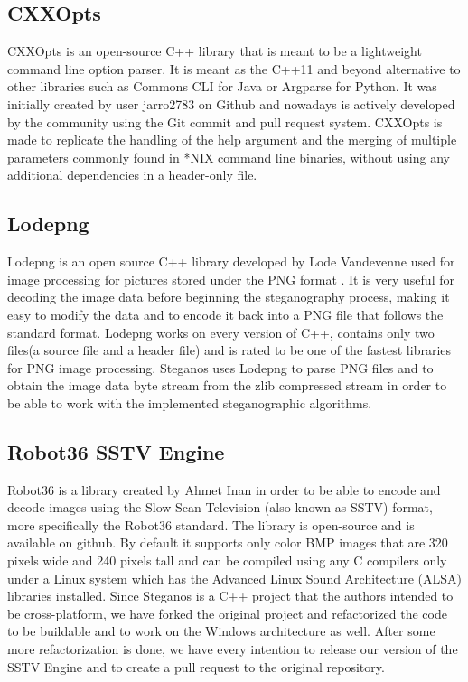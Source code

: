 \begin{multicols}{2}
\subsection{CXXOpts}
CXXOpts is an open-source C++ library that is meant to be a lightweight command line option parser\cite{jarro2783_2020}. It is meant as the C++11 and beyond alternative to other libraries such as Commons CLI for Java or Argparse for Python. It was initially created by user jarro2783 on Github and nowadays is actively developed by the community using the Git commit and pull request system. CXXOpts is made to replicate the handling of the help argument and the merging of multiple parameters commonly found in *NIX command line binaries, without using any additional dependencies in a header-only file.


\subsection{Lodepng}
Lodepng is an open source C++ library developed by Lode Vandevenne used for image processing for pictures stored under the PNG format \cite{lvandeve_2020}. It is very useful for decoding the image data before beginning the steganography process, making it easy to modify the data and to encode it back into a PNG file that follows the standard format. Lodepng works on every version of C++, contains only two files(a source file and a header file) and is rated to be one of the fastest libraries for PNG image processing. Steganos uses Lodepng to parse PNG files and to obtain the image data byte stream from the zlib compressed stream in order to be able to work with the implemented steganographic algorithms.

\subsection{Robot36 SSTV Engine}
Robot36 is a library created by Ahmet Inan in order to be able to encode and decode images using the Slow Scan Television (also known as SSTV) format, more specifically the Robot36 standard. The library is open-source and is available on github\cite{robot36_git}. By default it supports only color BMP images that are 320 pixels wide and 240 pixels tall and can be compiled using any C compilers only under a Linux system which has the Advanced Linux Sound Architecture (ALSA) libraries installed. Since Steganos is a C++ project that the authors intended to be cross-platform, we have forked the original project and refactorized the code to be buildable and to work on the Windows architecture as well. After some more refactorization is done, we have every intention to release our version of the SSTV Engine and to create a pull request to the original repository.


\end{multicols}
